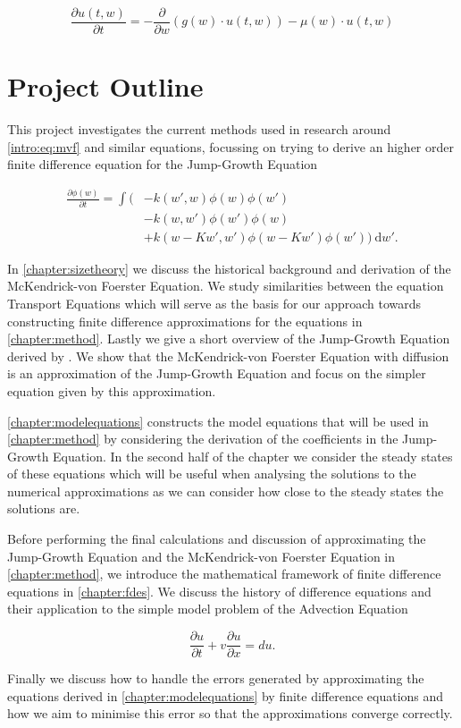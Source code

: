 \documentclass[../main.tex]{subfiles}
\begin{document}
  \begin{equation} \label{intro:eq:mvf}
    \frac{\partial u(t, w)}{\partial t} = - \frac{\partial}{\partial w} \left(g(w) \cdot u(t, w) \right) - \mu(w) \cdot u(t, w)
  \end{equation}

  \section*{Project Outline}
  This project investigates the current methods used in research around \autoref{intro:eq:mvf} and similar equations, focussing on trying to derive an higher order finite difference equation for the Jump-Growth Equation

  \begin{align}\label{intro:eq:jumpgrowth}
    \frac{\partial \phi(w)}{\partial t}
    = \int ( &- k(w', w) \phi(w)\phi(w') \nonumber \\
    & - k(w, w')\phi(w')\phi(w) \nonumber \\
    & + k(w - Kw', w')\phi(w - Kw')\phi(w')) \: \mathrm{d}w'.
  \end{align}

  In \autoref{chapter:sizetheory} we discuss the historical background and derivation of the McKendrick-von Foerster Equation. We study similarities between the equation Transport Equations which will serve as the basis for our approach towards constructing finite difference approximations for the equations in \autoref{chapter:method}. Lastly we give a short overview of the Jump-Growth Equation derived by \cite{datta2010}. We show that the McKendrick-von Foerster Equation with diffusion is an approximation of the Jump-Growth Equation and focus on the simpler equation given by this approximation.

  \autoref{chapter:modelequations} constructs the model equations that will be used in \autoref{chapter:method} by considering the derivation of the coefficients in the Jump-Growth Equation. In the second half of the chapter we consider the steady states of these equations which will be useful when analysing the solutions to the numerical approximations as we can consider how close to the steady states the solutions are.

  Before performing the final calculations and discussion of approximating the Jump-Growth Equation and the McKendrick-von Foerster Equation in \autoref{chapter:method}, we introduce the mathematical framework of finite difference equations in \autoref{chapter:fdes}. We discuss the history of difference equations and their application to the simple model problem of the Advection Equation

  \begin{equation}
    \frac{\partial u}{\partial t} + v \frac{\partial u}{\partial x} = d u.
  \end{equation}

  Finally we discuss how to handle the errors generated by approximating the equations derived in \autoref{chapter:modelequations} by finite difference equations and how we aim to minimise this error so that the approximations converge correctly.
\end{document}
